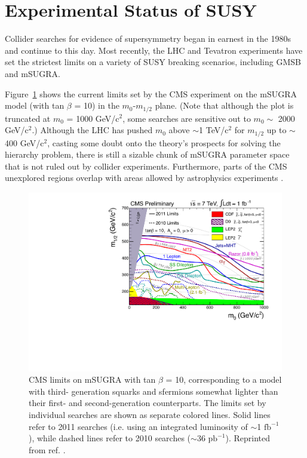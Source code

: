 \documentclass[dissertation.tex]{subfiles}
\begin{document}
\section{Experimental Status of SUSY}
\label{sec:Experimental Status of SUSY}

Collider searches for evidence of supersymmetry began in earnest in the 1980s \cite{SUSY_history} and continue to this day.  Most recently, the LHC and Tevatron experiments have set the strictest limits on a variety of SUSY breaking scenarios, including GMSB and mSUGRA.

Figure~\ref{fig:CMS_SUSY_2011Limits_tanb10} shows the current limits set by the CMS experiment on the mSUGRA model (with tan $\beta$ = 10) in the $m_{0}$-$m_{1/2}$ plane.  (Note that although the plot is truncated at $m_{0}$ = 1000 GeV/$\mbox{c}^{2}$, some searches are sensitive out to $m_{0} \sim$ 2000 GeV/$\mbox{c}^{2}$.)  Although the LHC has pushed $m_{0}$ above $\sim$1 TeV/$\mbox{c}^{2}$ for $m_{1/2}$ up to $\sim$400 GeV/$\mbox{c}^{2}$, casting some doubt onto the theory's prospects for solving the hierarchy problem, there is still a sizable chunk of mSUGRA parameter space that is not ruled out by collider experiments.  Furthermore, parts of the CMS unexplored regions overlap with areas allowed by astrophysics experiments \cite{CMSSM_fits}.

\begin{figure}
	\centering
	\includegraphics[scale=0.6]{CMS_SUSY_2011Limits_tanb10}
	\caption{CMS limits on mSUGRA with tan $\beta$ = 10, corresponding to a model with third- generation squarks and sfermions somewhat lighter than their first- and second-generation counterparts.  The limits set by individual searches are shown as separate colored lines.  Solid lines refer to 2011 searches (i.e. using an integrated luminosity of $\sim$1 $\mbox{fb}^{-1}$), while dashed lines refer to 2010 searches ($\sim$36 $\mbox{pb}^{-1}$).  Reprinted from ref. \cite{CMS_mSUGRA}.}
	\label{fig:CMS_SUSY_2011Limits_tanb10}
\end{figure}
\end{document}
